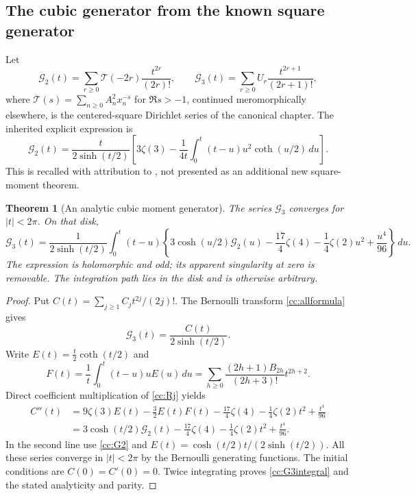 \documentclass[11pt,letterpaper]{article}
\newtheorem{theorem}{Theorem}[section]
\theoremstyle{definition}
\theoremstyle{remark}
\numberwithin{equation}{section}
\begin{document}
\subsection{The cubic generator from the known square generator}

Let
\[
 \mathcal G_2(t)=\sum_{r\ge0}\mathcal T(-2r)\frac{t^{2r}}{(2r)!},
 \qquad
 \mathcal G_3(t)=\sum_{r\ge0}U_r\frac{t^{2r+1}}{(2r+1)!},
\]
where $\mathcal T(s)=\sum_{n\ge0}A_n^2x_n^{-s}$ for $\Re s>-1$,
continued meromorphically elsewhere, is the centered-square Dirichlet
series of the canonical chapter. The inherited explicit expression is
\begin{equation}\label{cc:G2}
 \mathcal G_2(t)=\frac{t}{2\sinh(t/2)}
 \left[3\zeta(3)-\frac1{4t}
       \int_0^t(t-u)u^2\coth(u/2)\,du\right].
\end{equation}
This is recalled with attribution to \cite{cc:repo-square}, not
presented as an additional new square-moment theorem.

\begin{theorem}[An analytic cubic moment generator]
\label{cc:generator}
The series $\mathcal G_3$ converges for $|t|<2\pi$.  On that disk,
\begin{equation}\label{cc:G3integral}
 \boxed{\displaystyle
 \mathcal G_3(t)=\frac1{2\sinh(t/2)}
 \int_0^t(t-u)\left\{
    3\cosh(u/2)\mathcal G_2(u)-\frac{17}{4}\zeta(4)
    -\frac14\zeta(2)u^2+\frac{u^4}{96}
 \right\}\,du.}
\end{equation}
The expression is holomorphic and odd; its apparent singularity at
zero is removable.  The integration path lies in the disk and is
otherwise arbitrary.
\end{theorem}

\begin{proof}
Put $C(t)=\sum_{j\ge1}C_jt^{2j}/(2j)!$.
The Bernoulli transform \eqref{cc:allformula} gives
\[
 \mathcal G_3(t)=\frac{C(t)}{2\sinh(t/2)}.
\]
Write $E(t)=\tfrac t2\coth(t/2)$ and
\[
 F(t)=\frac1t\int_0^t(t-u)uE(u)\,du
     =\sum_{h\ge0}\frac{(2h+1)B_{2h}}{(2h+3)!}t^{2h+2}.
\]
Direct coefficient multiplication of \eqref{cc:Rj} yields
\begin{align*}
 C''(t)
 &=9\zeta(3)E(t)-\frac32E(t)F(t)
          -\frac{17}{4}\zeta(4)-\frac14\zeta(2)t^2+\frac{t^4}{96}\\
 &=3\cosh(t/2)\mathcal G_2(t)
          -\frac{17}{4}\zeta(4)-\frac14\zeta(2)t^2+\frac{t^4}{96}.
\end{align*}
In the second line use \eqref{cc:G2} and
$E(t)=\cosh(t/2)t/(2\sinh(t/2))$.
All these series converge in $|t|<2\pi$ by the Bernoulli generating
functions.  The initial conditions are $C(0)=C'(0)=0$.
Twice integrating proves \eqref{cc:G3integral} and the stated
analyticity and parity.
\end{proof}
\end{document}

